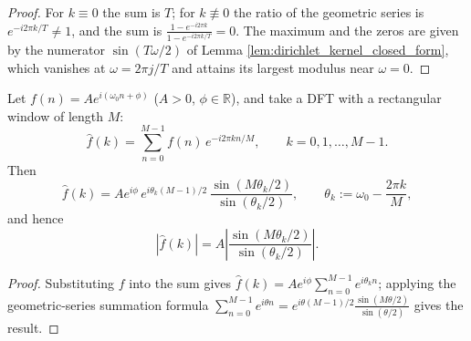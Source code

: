 \begin{proof}
For $k\equiv0$ the sum is $T$; for $k\not\equiv0$ the ratio of the geometric series is $e^{-i2\pi k/T}\ne1$, and the sum is $\frac{1-e^{-i2\pi k}}{1-e^{-i2\pi k/T}}=0$. The maximum and the zeros are given by the numerator $\sin(T\omega/2)$ of Lemma \ref{lem:dirichlet_kernel_closed_form}, which vanishes at $\omega=2\pi j/T$ and attains its largest modulus near $\omega=0$.
\end{proof}

\begin{proposition}\label{prop:single_tone_leakage_parallel}
Let $f(n)=A e^{i(\omega_0 n+\phi)}$ ($A>0$, $\phi\in\mathbb{R}$), and take a DFT with a rectangular window of length $M$:
\[
\hat f(k)=\sum_{n=0}^{M-1}f(n)\,e^{-i2\pi kn/M},\qquad k=0,1,\dots,M-1.
\]
Then
\[
\hat f(k)=A e^{i\phi}\,e^{i\theta_k(M-1)/2}\,\frac{\sin(M\theta_k/2)}{\sin(\theta_k/2)},
\qquad \theta_k:=\omega_0-\frac{2\pi k}{M},
\]
and hence
\[
|\hat f(k)|=A\left|\frac{\sin(M\theta_k/2)}{\sin(\theta_k/2)}\right|.
\]
\end{proposition}

\begin{proof}
Substituting $f$ into the sum gives $\hat f(k)=Ae^{i\phi}\sum_{n=0}^{M-1}e^{i\theta_k n}$; applying the geometric-series summation formula $\sum_{n=0}^{M-1}e^{i\theta n}=e^{i\theta(M-1)/2}\frac{\sin(M\theta/2)}{\sin(\theta/2)}$ gives the result.
\end{proof}


